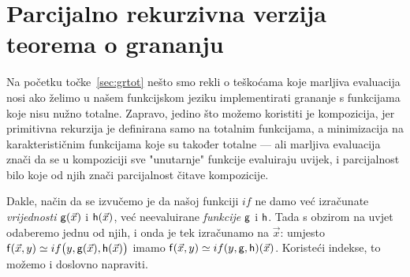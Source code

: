 \section{Parcijalno rekurzivna verzija teorema o grananju}

Na početku točke~\ref{sec:grtot} nešto smo rekli o teškoćama koje marljiva evaluacija nosi ako želimo u našem funkcijskom jeziku implementirati grananje s funkcijama koje nisu nužno totalne. Zapravo, jedino što možemo koristiti je kompozicija, jer primitivna rekurzija je definirana samo na totalnim funkcijama, a minimizacija na karakterističnim funkcijama koje su također totalne --- ali marljiva evaluacija znači da se u kompoziciji sve "unutarnje" funkcije evaluiraju uvijek, i parcijalnost bilo koje od njih znači parcijalnost čitave kompozicije.

Dakle, način da se izvučemo je da našoj funkciji $if$ ne damo već izračunate \emph{vrijednosti} $\mathsf g(\vec x)$ i $\mathsf h(\vec x)$, već neevaluirane \emph{funkcije} $\mathsf g$ i $\mathsf h$. Tada s obzirom na uvjet odaberemo jednu od njih, i onda je tek izračunamo na $\vec x$: umjesto $\mathsf f(\vec x,y)\simeq if\bigl(y,\mathsf g(\vec x),\mathsf h(\vec x)\bigr)$ imamo $\mathsf f(\vec x,y)\simeq if(y,\mathsf g,\mathsf h)(\vec x)$. Koristeći indekse, to možemo i doslovno napraviti.

